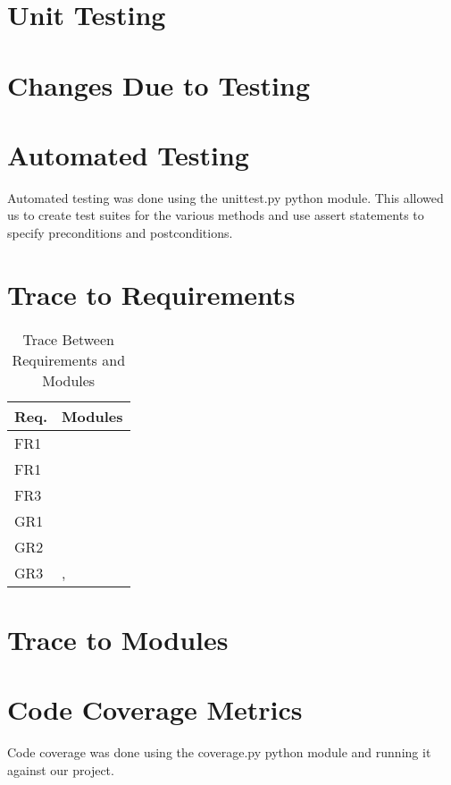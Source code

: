 \documentclass[12pt, titlepage]{article}
\begin{document}
\section{Unit Testing}

\section{Changes Due to Testing}

\section{Automated Testing}

Automated testing was done using the unittest.py python module. This allowed us to create test suites for the various methods and use assert statements to specify preconditions and postconditions.
		
\section{Trace to Requirements}

\begin{table}[H]
		\centering
		\begin{tabular}{p{} p{}}
			\toprule
			\textbf{Req.} & \textbf{Modules}\\
			\midrule
			FR1 & \mref{...}\\
			FR1 & \mref{...}\\
			FR3 & \mref{...}\\
			GR1 & \mref{...}\\
			GR2 & \mref{...}\\
			GR3 & \mref{...}, \mref{...}\\
			\bottomrule
		\end{tabular}
		\caption{Trace Between Requirements and Modules}
		\label{TblRT}
	\end{table}
		
\section{Trace to Modules}		

\section{Code Coverage Metrics}

Code coverage was done using the coverage.py python module and running it against our project.




\end{document}
